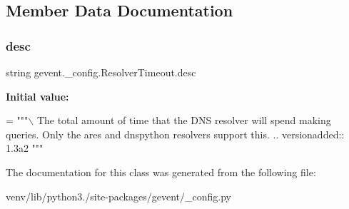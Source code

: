 \subsection{Member Data Documentation}
\mbox{\label{classgevent_1_1__config_1_1_resolver_timeout_aa9943d166cdaa87e19ef0070ab6278f4}} 
\subsubsection{\texorpdfstring{desc}{desc}}
{\footnotesize\ttfamily string gevent.\+\_\+config.\+Resolver\+Timeout.\+desc\hspace{0.3cm}{\ttfamily [static]}}

{\bfseries Initial value\+:}
\begin{DoxyCode}
=  \textcolor{stringliteral}{"""\(\backslash\)}
\textcolor{stringliteral}{The total amount of time that the DNS resolver will spend making queries.}
\textcolor{stringliteral}{}
\textcolor{stringliteral}{Only the ares and dnspython resolvers support this.}
\textcolor{stringliteral}{}
\textcolor{stringliteral}{.. versionadded:: 1.3a2}
\textcolor{stringliteral}{"""}
\end{DoxyCode}


The documentation for this class was generated from the following file\+:\begin{DoxyCompactItemize}
\item 
venv/lib/python3./site-\/packages/gevent/\+\_\+config.\+py\end{DoxyCompactItemize}
